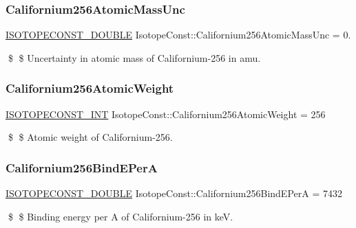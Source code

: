 \subsubsection{\texorpdfstring{Californium256\+Atomic\+Mass\+Unc}{Californium256AtomicMassUnc}}
{\footnotesize\ttfamily \mbox{\hyperlink{group___isotope_const-_macros_ga8f45a7272ce02c0b4c65c44636ed719a}{I\+S\+O\+T\+O\+P\+E\+C\+O\+N\+S\+T\+\_\+\+D\+O\+U\+B\+LE}} Isotope\+Const\+::\+Californium256\+Atomic\+Mass\+Unc = 0.}

\$ \$ Uncertainty in atomic mass of Californium-\/256 in amu. \mbox{\label{group___isotope_const-_californium-_cf256_ga0c7e98c0070eeca82b969239fa01aeaa}} 
\subsubsection{\texorpdfstring{Californium256\+Atomic\+Weight}{Californium256AtomicWeight}}
{\footnotesize\ttfamily \mbox{\hyperlink{group___isotope_const-_macros_ga5f18360b3e99483a35c32d789e62621c}{I\+S\+O\+T\+O\+P\+E\+C\+O\+N\+S\+T\+\_\+\+I\+NT}} Isotope\+Const\+::\+Californium256\+Atomic\+Weight = 256}

\$ \$ Atomic weight of Californium-\/256. \mbox{\label{group___isotope_const-_californium-_cf256_ga7961638f88bae956e5c2d4f42b1509fd}} 
\subsubsection{\texorpdfstring{Californium256\+Bind\+E\+PerA}{Californium256BindEPerA}}
{\footnotesize\ttfamily \mbox{\hyperlink{group___isotope_const-_macros_ga8f45a7272ce02c0b4c65c44636ed719a}{I\+S\+O\+T\+O\+P\+E\+C\+O\+N\+S\+T\+\_\+\+D\+O\+U\+B\+LE}} Isotope\+Const\+::\+Californium256\+Bind\+E\+PerA = 7432}

\$ \$ Binding energy per A of Californium-\/256 in keV. \mbox{\label{group___isotope_const-_californium-_cf256_ga090514716fa1ba23efedab1d9b56c139}} 
